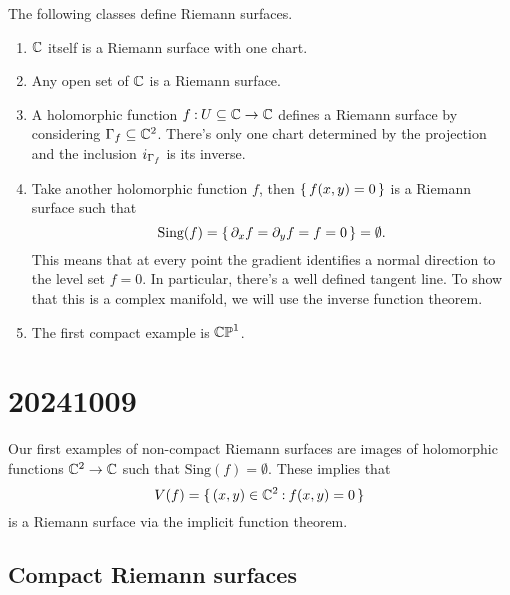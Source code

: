\documentclass[12pt]{memoir}
\begin{document}
\begin{Ex}
    The following classes define Riemann surfaces.
    \begin{enumerate}
    \item $\mathbb{C}$ itself is a Riemann surface with one chart.
    \item Any open set of $\mathbb{C}$ is a Riemann surface.
    \item A holomorphic function $f\mathbin{:} U\subseteq\mathbb{C}\to\mathbb{C}$ defines a Riemann surface by considering $\Gamma_f\subseteq\mathbb{C}^2$. There's only one chart determined by the projection and the inclusion $i_{\Gamma_f}$ is its inverse.
    \item Take another holomorphic function $f$, then $\{\,f(x,y)=0\,\}$ is a Riemann surface such that 
    $$\text{Sing}(f)=\{\,\partial_xf=\partial_yf=f=0\,\}=\emptyset.$$
    This means that at every point the gradient identifies a normal direction to the level set $f=0$. In particular, there's a well defined tangent line. To show that this is a complex manifold, we will use the inverse function theorem. 
    \item The first compact example is $\mathbb{CP}^1$.
    \end{enumerate}
\end{Ex}

\section{20241009}

Our first examples of non-compact Riemann surfaces are images of holomorphic functions $\mathbb{C}^2\to\mathbb{C}$ such that $\text{Sing}(f)=\emptyset$. These implies that 
$$V(f)=\{\,(x,y)\in\mathbb{C}^2\mathbin{:} f(x,y)=0\,\}$$
is a Riemann surface via the implicit function theorem.

\subsection{Compact Riemann surfaces}
\end{document}
